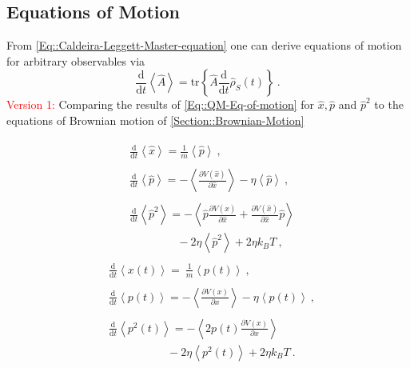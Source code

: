	\subsection{Equations of Motion}
	From \autoref{Eq::Caldeira-Leggett-Master-equation} one can derive equations of motion for arbitrary observables via
	\begin{equation}\label{Eq::QM-Eq-of-motion}
		\frac{\text{d}}{\text{d}t} \left \langle \hat{A} \right \rangle =	\text{tr} \left\{\hat{A} \frac{\text{d}}{\text{d}t } \hat{\rho}_S(t)\right\}~.
	\end{equation}
	\textcolor{red}{Version 1:}
	Comparing the results of \autoref{Eq::QM-Eq-of-motion} for $\hat{x}, \hat{p}$ and $\hat{p}^2$ to the equations of Brownian motion of \autoref{Section::Brownian-Motion}
	\begin{multicols}{2}
		\noindent
		\begin{align*}
			\begin{split}
				&\frac{\text{d}}{\text{d}t} \left \langle \hat{x} \right \rangle =	\frac{1}{m} \left\langle \hat{p} \right \rangle~,
			\end{split}
			\\
			\begin{split}
				&\frac{\text{d}}{\text{d}t} \left \langle \hat{p} \right \rangle = - 	\left\langle  \frac{\partial V(\hat{x})}{\partial \hat{x}} \right \rangle - \eta \left \langle \hat{p} \right \rangle ~,
			\end{split}
			\\
			\begin{split}
				&\frac{\text{d}}{\text{d}t} \left \langle \hat{p}^2 \right \rangle =	- \left\langle \hat{p} \frac{\partial V(\hat{x})}{\partial \hat{x}} + \frac{\partial V(\hat{x})}{\partial \hat{x}} \hat{p} \right \rangle \\
				&\qquad \qquad ~- 2 \eta \left \langle \hat{p}^2 \right \rangle + 2 \eta k_B T ~,
			\end{split}
		\end{align*}
		\begin{align*}
			\begin{split}
				&\frac{\text{d}}{\text{d}t} \left \langle {x}(t) \right \rangle  =	~\frac{1}{m} \left \langle {p}(t) \right \rangle ~,
			\end{split}
			\\
			\begin{split}
				&\frac{\text{d}}{\text{d}t} \left \langle {p}(t) \right \rangle =	- 	\left \langle \frac{\partial V({x})}{\partial {x}} \right \rangle - \eta \left \langle {p}(t) \right \rangle ~,
			\end{split}
			\\
			\begin{split}
				&\frac{\text{d}}{\text{d}t} \left \langle {p}^2(t) \right \rangle = - \left\langle 2 {p}(t) \frac{\partial V({x})}{\partial {x}}\right \rangle \\
				&\qquad \qquad \quad ~ - 2 \eta \left \langle {p}^2(t) \right \rangle + 2 \eta k_B T~.
			\end{split}
		\end{align*}
	\end{multicols}	
